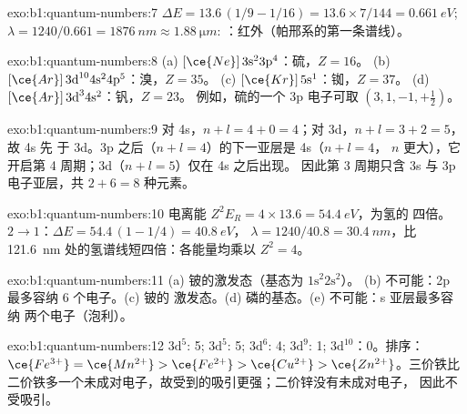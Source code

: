 \begin{solution}{exo:b1:quantum-numbers:7}
$\Delta E = 13.6\,(1/9 - 1/16) = 13.6 \times 7/144 = \qty{0.661}{eV}$;
$\lambda = 1240/0.661 = \qty{1876}{nm} \approx \qty{1.88}{\micro m}$:
：红外（帕邢系的第一条谱线）。
\end{solution}

\begin{solution}{exo:b1:quantum-numbers:8}
(a) $[\ce{Ne}]\,3\text{s}^2 3\text{p}^4$：硫，$Z = 16$。
(b) $[\ce{Ar}]\,3\text{d}^{10} 4\text{s}^2 4\text{p}^5$：溴，$Z = 35$。
(c) $[\ce{Kr}]\,5\text{s}^1$：铷，$Z = 37$。
(d) $[\ce{Ar}]\,3\text{d}^3 4\text{s}^2$：钒，$Z = 23$。
例如，硫的一个 3p 电子可取 $(3, 1, -1, +\tfrac12)$。
\end{solution}

\begin{solution}{exo:b1:quantum-numbers:9}
对 4s，$n + l = 4 + 0 = 4$；对 3d，$n + l = 3 + 2 = 5$，故 4s 先
于 3d。3p 之后（$n + l = 4$）的下一亚层是 4s（$n + l = 4$，
$n$ 更大），它开启第 4 周期；3d（$n + l = 5$）仅在 4s 之后出现。
因此第 3 周期只含 3s 与 3p 电子亚层，共 $2 + 6 = 8$ 种元素。
\end{solution}

\begin{solution}{exo:b1:quantum-numbers:10}
电离能 $Z^2E_R = 4 \times 13.6 = \qty{54.4}{eV}$，为氢的
四倍。$2 \to 1$：$\Delta E = 54.4\,(1 - 1/4) = \qty{40.8}{eV}$，
$\lambda = 1240/40.8 = \qty{30.4}{nm}$，比
\qty{121.6}{nm} 处的氢谱线短四倍：各能量均乘以 $Z^2 = 4$。
\end{solution}

\begin{solution}{exo:b1:quantum-numbers:11}
(a) 铍的激发态（基态为 $1\text{s}^2 2\text{s}^2$）。
(b) 不可能：2p 最多容纳 6 个电子。(c) 铍的
激发态。(d) 磷的基态。(e) 不可能：s 亚层最多容纳
两个电子（泡利）。
\end{solution}

\begin{solution}{exo:b1:quantum-numbers:12}
 $3\text{d}^5$: 5;  $3\text{d}^5$: 5; 
$3\text{d}^6$: 4;  $3\text{d}^9$: 1; 
$3\text{d}^{10}$：0。排序：$\ce{Fe^{3+}} = \ce{Mn^{2+}} > \ce{Fe^{2+}}
> \ce{Cu^{2+}} > \ce{Zn^{2+}}$。三价铁比
二价铁多一个未成对电子，故受到的吸引更强；二价锌没有未成对电子，
因此不受吸引。
\end{solution}

